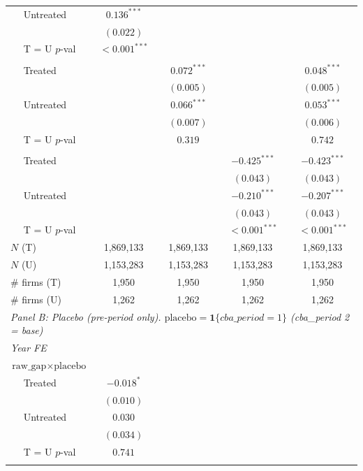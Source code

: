 \begin{table}[H]
\begin{tabular}{lcccc}
$\quad$ Untreated & $0.136^{***}$ &  &  &  \\
 & $(0.022)$ &  &  &  \\
$\quad$ T = U $p$-val & $<\!0.001^{***}$ &  &  &  \\
\addlinespace[2pt]
\multicolumn{5}{l}{$\text{gap} \times \text{post}$} \\
$\quad$ Treated &  & $0.072^{***}$ &  & $0.048^{***}$ \\
 &  & $(0.005)$ &  & $(0.005)$ \\
$\quad$ Untreated &  & $0.066^{***}$ &  & $0.053^{***}$ \\
 &  & $(0.007)$ &  & $(0.006)$ \\
$\quad$ T = U $p$-val &  & $0.319$ &  & $0.742$ \\
\addlinespace[2pt]
\multicolumn{5}{l}{$\text{surplus} \times \text{post}$} \\
$\quad$ Treated &  &  & $-0.425^{***}$ & $-0.423^{***}$ \\
 &  &  & $(0.043)$ & $(0.043)$ \\
$\quad$ Untreated &  &  & $-0.210^{***}$ & $-0.207^{***}$ \\
 &  &  & $(0.043)$ & $(0.043)$ \\
$\quad$ T = U $p$-val &  &  & $<\!0.001^{***}$ & $<\!0.001^{***}$ \\
\addlinespace[2pt]
$N$ (T) & 1,869,133 & 1,869,133 & 1,869,133 & 1,869,133 \\
$N$ (U) & 1,153,283 & 1,153,283 & 1,153,283 & 1,153,283 \\
\# firms (T) & 1,950 & 1,950 & 1,950 & 1,950 \\
\# firms (U) & 1,262 & 1,262 & 1,262 & 1,262 \\
\midrule
\multicolumn{5}{l}{\textit{Panel B: Placebo (pre-period only). $\text{placebo} = \mathbf{1}\{cba\_period = 1\}$ (cba\_period 2 = base)}} \\
\midrule
\multicolumn{5}{l}{\textit{Year FE}} \\
\multicolumn{5}{l}{$\text{raw\_gap} \times \text{placebo}$} \\
$\quad$ Treated & $-0.018^{*}$ &  &  &  \\
 & $(0.010)$ &  &  &  \\
$\quad$ Untreated & $0.030$ &  &  &  \\
 & $(0.034)$ &  &  &  \\
$\quad$ T = U $p$-val & $0.741$ &  &  &  \\
\addlinespace[2pt]
\multicolumn{5}{l}{$\text{gap} \times \text{placebo}$} \\

\end{tabular}
\end{table}
